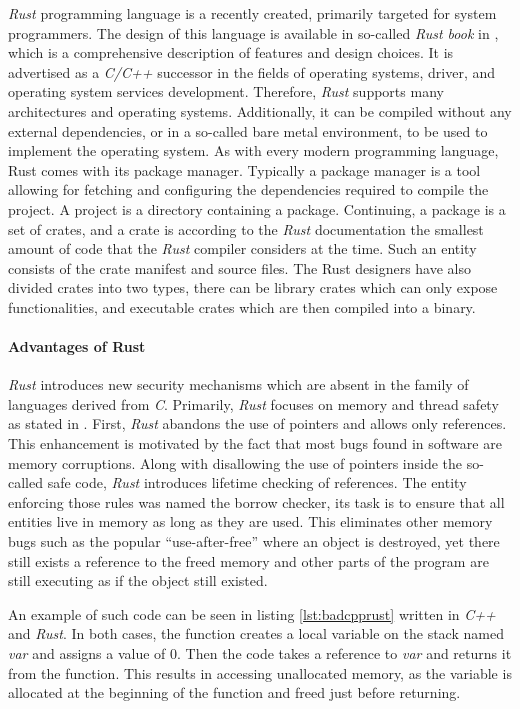 \textit{Rust} programming language is a recently created, primarily targeted for system programmers. The design of this language is available in so-called \textit{Rust book} in \cite{rustbook}, which is a comprehensive description of features and design choices.  It is advertised as a \textit{C/C++} successor in the fields of operating systems, driver, and operating system services development. Therefore, \textit{Rust} supports many architectures and operating systems. Additionally, it can be compiled without any external dependencies, or in a so-called bare metal environment, to be used to implement the operating system. As with every modern programming language, Rust comes with its package manager. Typically a package manager is a tool allowing for fetching and configuring the dependencies required to compile the project. A project is a directory containing a package. Continuing, a package is a set of crates, and a crate is according to the \textit{Rust} documentation the smallest amount of code that the \textit{Rust} compiler considers at the time. Such an entity consists of the crate manifest and source files. The Rust designers have also divided crates into two types, there can be library crates which can only expose functionalities, and executable crates which are then compiled into a binary.

\paragraph{Advantages of Rust}
\textit{Rust} introduces new security mechanisms which are absent in the family of languages derived from \textit{C}. Primarily, \textit{Rust} focuses on memory and thread safety as stated in \cite{rustmemorysafety}. First, \textit{Rust} abandons the use of pointers and allows only references. This enhancement is motivated by the fact that most bugs found in software are memory corruptions. Along with disallowing the use of pointers inside the so-called safe code, \textit{Rust} introduces lifetime checking of references. The entity enforcing those rules was named the borrow checker, its task is to ensure that all entities live in memory as long as they are used. This eliminates other memory bugs such as the popular “use-after-free” where an object is destroyed, yet there still exists a reference to the freed memory and other parts of the program are still executing as if the object still existed. 

An example of such code can be seen in listing \ref{lst:badcpprust} written in \textit{C++} and \textit{Rust}. In both cases, the function creates a local variable on the stack named \textit{var} and assigns a value of 0. Then the code takes a reference to \textit{var} and returns it from the function. This results in accessing unallocated memory, as the variable is allocated at the beginning of the function and freed just before returning. 

